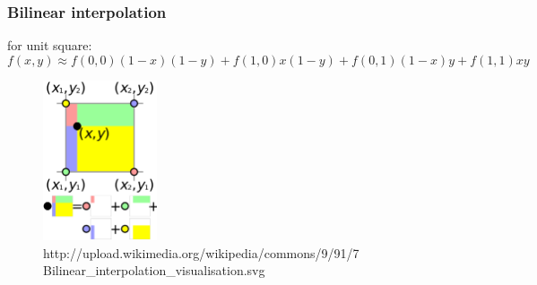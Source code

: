\documentclass{beamer}
\begin{document}
\begin{frame}
 \frametitle{Bilinear interpolation}
 for unit square:
 \begin{equation*}
  f(x,y) \approx f(0,0)(1-x)(1-y) + f(1,0)x(1-y) + f(0,1)(1-x)y + f(1,1)xy
 \end{equation*}
 \begin{figure}[H]
  \centering
  \includegraphics[width=0.3\textwidth]{bilinear_interpolation_visualisation.png}
  \caption{http://upload.wikimedia.org/wikipedia/commons/9/91/7
	   Bilinear\_interpolation\_visualisation.svg} %
\end{figure}
\end{frame}
\end{document}
